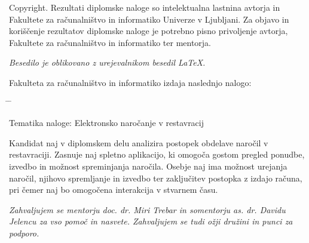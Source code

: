 \documentclass[a4paper, 12pt]{book}
\newcommand{\clearemptydoublepage}{\newpage{\pagestyle{empty}\cleardoublepage}}
\begin{document}
\noindent
{\sc Copyright}. 
Rezultati diplomske naloge so intelektualna lastnina avtorja in Fakultete za računalništvo in informatiko Univerze v Ljubljani.
Za objavo in koriščenje rezultatov diplomske naloge je potrebno pisno privoljenje avtorja, Fakultete za računalništvo in informatiko ter mentorja.

\begin{center}
\mbox{}\vfill
\emph{Besedilo je oblikovano z urejevalnikom besedil \LaTeX.}
\end{center}
\clearemptydoublepage

\thispagestyle{empty}
\vspace*{4cm}

\noindent
Fakulteta za računalništvo in informatiko izdaja naslednjo nalogo:
\medskip
\begin{tabbing}
\hspace{32mm}\= \hspace{6cm} \= \kill




Tematika naloge: Elektronsko naročanje v restavracij
\end{tabbing}
Kandidat naj v diplomskem delu analizira postopek obdelave naročil v restavraciji. Zasnuje naj spletno aplikacijo, ki omogoča gostom pregled ponudbe, izvedbo in možnost spreminjanja naročila. Osebje naj ima možnost urejanja naročil, njihovo spremljanje in izvedbo ter zaključitev postopka z izdajo računa, pri čemer naj bo omogočena interakcija v stvarnem času.
\vspace{15mm}






\vspace{2cm}

\clearemptydoublepage

\thispagestyle{empty}\mbox{}\vfill\null\it%
\noindent
Zahvaljujem se mentorju doc. dr. Miri Trebar in somentorju as. dr. Davidu Jelencu za vso pomoč in nasvete.
Zahvaljujem se tudi ožji družini in punci za podporo.
\rm\normalfont

\clearemptydoublepage

\end{document}
